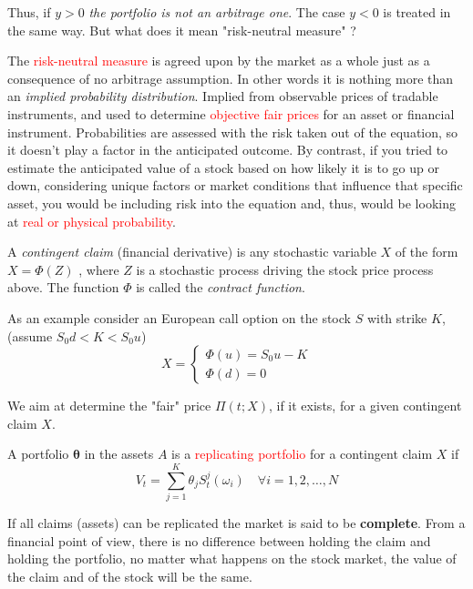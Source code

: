 \documentclass[12pt,a4paper]{book}
\begin{document}
Thus, if $y > 0$ \emph{the portfolio is not an arbitrage one}. The case $y < 0$ is treated in the same way. 
But what does it mean "risk-neutral measure" ?
		
The \textcolor{red}{risk-neutral measure} is agreed upon by the market as a whole just as a consequence of no arbitrage assumption.
In other words it is nothing more than an \emph{implied probability distribution}.
Implied from observable prices of tradable instruments, and used to determine \textcolor{red}{objective fair prices} for an asset or financial instrument. Probabilities are assessed with the risk taken out of the equation, so it doesn’t play a factor in the anticipated outcome.
By contrast, if you tried to estimate the anticipated value of a stock based on how likely it is to go up or down, considering unique factors or market conditions that influence that specific asset, you would be including risk into the equation and, thus, would be looking at \textcolor{red}{real or physical probability}.

A \emph{contingent claim} (financial derivative) is any stochastic variable $X$ of the form $X=\Phi(Z)$ , where $Z$ is a stochastic process driving the stock price process above. 
The function $\Phi$ is called the \emph{contract function}.

As an example consider an European call option on the stock $S$ with strike $K$, (assume $S_0d < K < S_0u$)
\begin{equation*}
X = \begin{cases}
\Phi(u) = S_0 u - K\\
\Phi(d) = 0
\end{cases}
\end{equation*}
		
We aim at determine the "fair" price $\Pi(t; X)$, if it exists, for a given contingent claim $X$.

A portfolio $\mathbf{\theta}$ in the assets $A$ is a \textcolor{red}{replicating portfolio} for a contingent claim $X$ if
\begin{equation}
V_t = \sum_{j=1}^K \theta_j S_t^j(\omega_i)\quad\forall i=1,2,\ldots,N
\end{equation}

If all claims (assets) can be replicated the market is said to be \textbf{complete}.
From a financial point of view, there is no difference between holding the claim and holding the portfolio, no matter what happens on the stock market, the value of the claim and of the stock will be the same.
	
\end{document}
